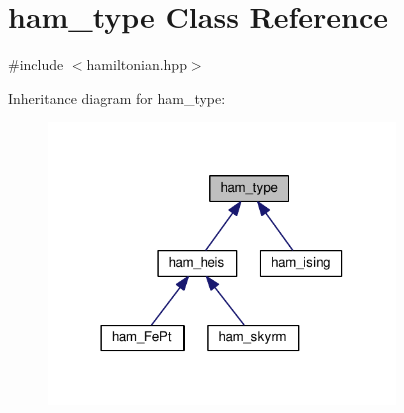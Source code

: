 \hypertarget{classham__type}{}\section{ham\+\_\+type Class Reference}
\label{classham__type}


{\ttfamily \#include $<$hamiltonian.\+hpp$>$}



Inheritance diagram for ham\+\_\+type\+:
\nopagebreak
\begin{figure}[H]
\begin{center}
\leavevmode
\includegraphics[width=261pt]{d5/d48/classham__type__inherit__graph}
\end{center}
\end{figure}
